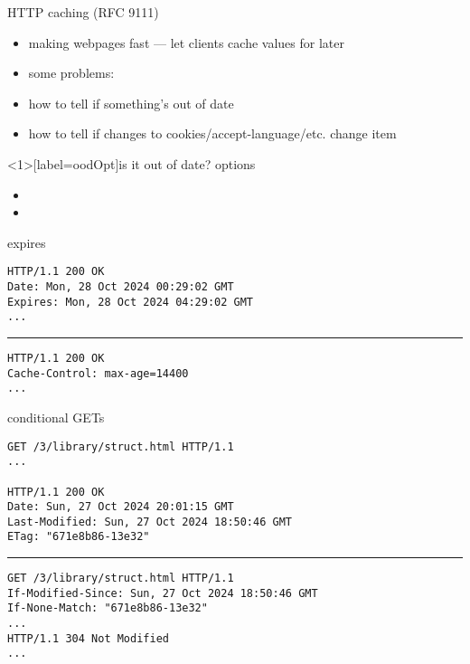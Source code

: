\begin{frame}{HTTP caching (RFC 9111)}
    \begin{itemize}
    \item making webpages fast --- let clients cache values for later
    \item some problems:
    \vspace{.5cm}
    \item how to tell if something's out of date
    \item how to tell if changes to cookies/accept-language/etc. change item
    \end{itemize}
\end{frame}

\begin{frame}<1>[label=oodOpt]{is it out of date? options}
    \begin{itemize}
    \item {}
    \item {}
    \end{itemize}
\end{frame}


\begin{frame}[fragile]{expires}
\begin{Verbatim}
HTTP/1.1 200 OK
Date: Mon, 28 Oct 2024 00:29:02 GMT
Expires: Mon, 28 Oct 2024 04:29:02 GMT
...
\end{Verbatim}
\rule{0.9\textwidth}{1mm}
\begin{Verbatim}
HTTP/1.1 200 OK
Cache-Control: max-age=14400
...
\end{Verbatim}
\end{frame}


\begin{frame}[fragile]{conditional GETs}
\begin{Verbatim}[fontsize=\fontsize{12}{13}]
GET /3/library/struct.html HTTP/1.1
...

HTTP/1.1 200 OK
Date: Sun, 27 Oct 2024 20:01:15 GMT
Last-Modified: Sun, 27 Oct 2024 18:50:46 GMT
ETag: "671e8b86-13e32"
\end{Verbatim}
\rule{0.9\textwidth}{1mm}
\begin{Verbatim}[fontsize=\fontsize{12}{13}]
GET /3/library/struct.html HTTP/1.1
If-Modified-Since: Sun, 27 Oct 2024 18:50:46 GMT
If-None-Match: "671e8b86-13e32"
...
HTTP/1.1 304 Not Modified
...
\end{Verbatim}
\end{frame}

